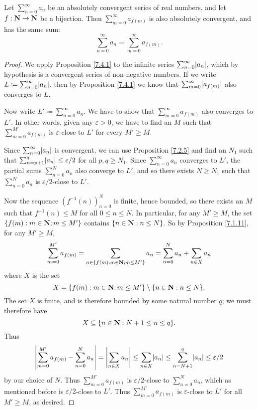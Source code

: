 \setcounter{theorem}{2}
\begin{proposition}\label{7.4.3}
    Let \(\sum_{n = 0}^\infty a_n\) be an absolutely convergent series of real numbers, and let \(f : \mathbf{N} \to \mathbf{N}\) be a bijection.
    Then \(\sum_{m = 0}^\infty a_{f(m)}\) is also absolutely convergent, and has the same sum:
    \[
        \sum_{n = 0}^\infty a_n = \sum_{m = 0}^\infty a_{f(m)}.
    \]
\end{proposition}

\begin{proof}
    We apply Proposition \ref{7.4.1} to the infinite series \(\sum_{n = 0}^\infty \abs{a_n}\), which by hypothesis is a convergent series of non-negative numbers.
    If we write \(L \coloneqq \sum_{n = 0}^\infty \abs{a_n}\), then by Proposition \ref{7.4.1} we know that \(\sum_{m = 0}^\infty \abs{a_{f(m)}}\) also converges to \(L\).

    Now write \(L' \coloneqq \sum_{n = 0}^\infty a_n\).
    We have to show that \(\sum_{m = 0}^\infty a_{f(m)}\) also converges to \(L'\).
    In other words, given any \(\varepsilon > 0\), we have to find an \(M\) such that \(\sum_{m = 0}^{M'} a_{f(m)}\) is \(\varepsilon\)-close to \(L'\) for every \(M' \geq M\).

    Since \(\sum_{n = 0}^\infty \abs{a_n}\) is convergent, we can use Proposition \ref{7.2.5} and find an \(N_1\) such that \(\sum_{n = p + 1}^q \abs{a_n} \leq \varepsilon / 2\) for all \(p, q \geq N_1\).
    Since \(\sum_{n = 0}^\infty a_n\) converges to \(L'\), the partial sums \(\sum_{n = 0}^N a_n\) also converge to \(L'\), and so there exists \(N \geq N_1\) such that \(\sum_{n = 0}^N a_n\) is \(\varepsilon / 2\)-close to \(L'\).

    Now the sequence \((f^{-1}(n))_{n = 0}^N\) is finite, hence bounded, so there exists an \(M\) such that \(f^{-1}(n) \leq M\) for all \(0 \leq n \leq N\).
    In particular, for any \(M' \geq M\), the set \(\{f(m) : m \in \mathbf{N}; m \leq M'\}\) contains \(\{n \in \mathbf{N} : n \leq N\}\).
    So by Proposition \ref{7.1.11}, for any \(M' \geq M\),
    \[
        \sum_{m = 0}^{M'} a_{f(m)} = \sum_{n \in \{f(m) : m \in \mathbf{N}; m \leq M'\}} a_n = \sum_{n = 0}^N a_n + \sum_{n \in X} a_n
    \]
    where \(X\) is the set
    \[
        X = \{f(m) : m \in \mathbf{N}; m \leq M'\} \setminus \{n \in \mathbf{N} : n \leq N\}.
    \]
    The set \(X\) is finite, and is therefore bounded by some natural number \(q\);
    we must therefore have
    \[
        X \subseteq \{n \in \mathbf{N} : N + 1 \leq n \leq q\}.
    \]
    Thus
    \[
        \abs{\sum_{m = 0}^{M'} a_{f(m)} - \sum_{n = 0}^N a_n} = \abs{\sum_{n \in X} a_n} \leq \sum_{n \in X} \abs{a_n} \leq \sum_{n = N + 1}^q \abs{a_n} \leq \varepsilon / 2
    \]
    by our choice of \(N\).
    Thus \(\sum_{m = 0}^{M'} a_{f(m)}\) is \(\varepsilon / 2\)-close to \(\sum_{n = 0}^N a_n\), which as mentioned before is \(\varepsilon / 2\)-close to \(L'\).
    Thus \(\sum_{m = 0}^{M'} a_{f(m)}\) is \(\varepsilon\)-close to \(L'\) for all \(M' \geq M\), as desired.
\end{proof}

